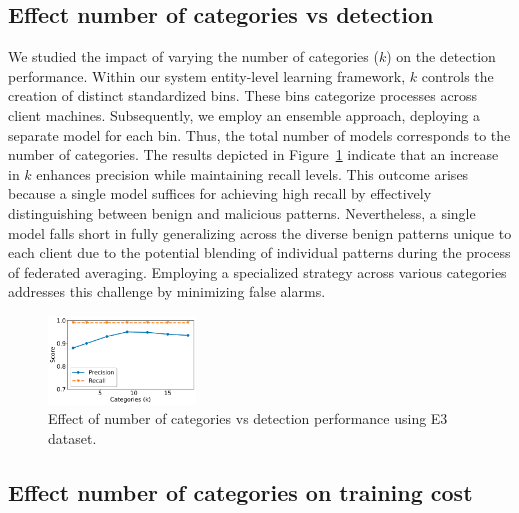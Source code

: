 \subsection{Effect number of categories vs detection}
\label{app:categories}

We studied the impact of varying the number of categories ($k$) on the detection performance. Within our system entity-level \gnnshort learning framework, $k$ controls the creation of distinct standardized bins. These bins categorize processes across client machines. Subsequently, we employ an ensemble approach, deploying a separate \gnnshort model for each bin. Thus, the total number of \gnnshort models corresponds to the number of categories. The results depicted in Figure~\ref{catgvsscore} indicate that an increase in $k$ enhances precision while maintaining recall levels. This outcome arises because a single model suffices for achieving high recall by effectively distinguishing between benign and malicious patterns. Nevertheless, a single model falls short in fully generalizing across the diverse benign patterns unique to each client due to the potential blending of individual patterns during the process of federated averaging. Employing a specialized \gnnshort strategy across various categories addresses this challenge by minimizing false alarms.

\begin{figure}[!h]
  \centering
  \includegraphics[width=0.35\textwidth]{fig/kvsscore.pdf}
  \caption{Effect of number of categories vs detection performance using E3 dataset.}
  \label{catgvsscore}
  \vspace{-2ex}
\end{figure}

\subsection{Effect number of categories on training cost}
\label{app:traincost}

